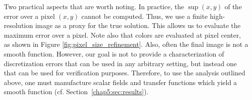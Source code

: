 Two practical aspects that are worth noting. 
In practice, the $\sup(x,y)$ of the error over a pixel $(x,y)$ cannot be computed. 
Thus, we use a finite high-resolution 
image as a proxy for the true solution. This allows us to 
evaluate the maximum error over a pixel. Note also that colors are evaluated at pixel
center, as shown in Figure \ref{fig:pixel_size_refinement}.
%
Also, often the final image is not
a smooth function. However, our goal is not to provide a
characterization of discretization errors that can be used in any arbitrary
setting, but instead one that can be used for
verification purposes. Therefore, 
to use the analysis outlined above,
one must manufacture scalar fields and transfer functions which yield a smooth function (cf. Section~\ref{chap5:sec:results}).



